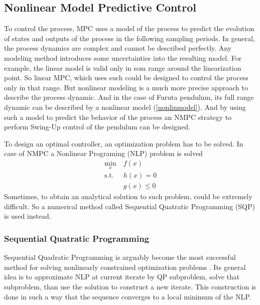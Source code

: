 \subsection{Nonlinear Model Predictive Control}\label{nmpcsection}
To control the process, MPC uses a model of the process to predict the evolution of states and outputs of the process in the following sampling periods. In general, the process dynamics are complex and cannot be described perfectly. Any modeling method introduces some uncertainties into the resulting model. For example, the linear model is valid only in som range around the linearization point. So linear MPC, which uses such could be designed to control the process only in that range. But nonlinear modeling is a much more precise approach to describe the process dynamic. And in the case of Furuta pendulum, its full range dynamic can be described by a nonlinear model (\ref{nonlinmodel}). And by using such a model to predict the behavior of the process an NMPC strategy to perform Swing-Up control of the pendulum can be designed.

To design an optimal controller, an optimization problem has to be solved. In case of NMPC a Nonlinear Programing (NLP) problem is solved
\begin{subequations}\label{nlpgeneral}
	\begin{align}
	\min_{x}\  &f(x)\\
	\text{s.t.}\  &h(x) = 0\\
		 &g(x)\leq 0
	\end{align}
\end{subequations}
Sometimes, to obtain an analytical solution to such problem, could be extremely difficult. So a numerical method called Sequential Quatratic Programming (SQP) is used instead.
\subsubsection{Sequential Quatratic Programming}
Sequential Quadratic Programming is arguably become the most successful method for solving nonlinearly constrained optimization problems \cite{SQP:Theory}. Its general idea is to approximate NLP at current iterate by QP subproblem, solve that subproblem, than use the solution to construct a new iterate. This construction is done in such a way that the sequence converges to a local minimum of the NLP.

